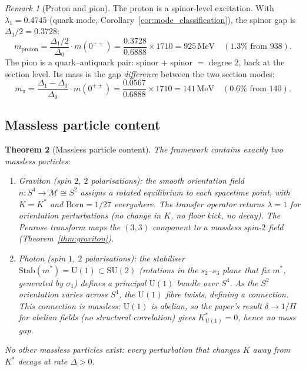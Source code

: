 \documentclass[11pt,a4paper]{article}
\newtheorem{theorem}{Theorem}[section]
\theoremstyle{definition}
\theoremstyle{remark}
\newtheorem{remark}[theorem]{Remark}
\begin{document}
\begin{remark}[Proton and pion]\label{rem:proton_pion}
The proton is a spinor-level excitation. With $\lambda_1=0.4745$ (quark mode, Corollary~\ref{cor:mode_classification}), the spinor gap is $\Delta_1/2=0.3728$:
\[
m_\mathrm{proton} = \frac{\Delta_1/2}{\Delta_0}\cdot m(0^{++}) = \frac{0.3728}{0.6888}\times 1710 = 925\,\mathrm{MeV} \quad (1.3\%\text{ from }938).
\]
The pion is a quark--antiquark pair: spinor $+$ spinor $=$ degree $2$, back at the section level. Its mass is the gap \emph{difference} between the two section modes:
\[
m_\pi = \frac{\Delta_1-\Delta_0}{\Delta_0}\cdot m(0^{++}) = \frac{0.0567}{0.6888}\times 1710 = 141\,\mathrm{MeV} \quad (0.6\%\text{ from }140).
\]
\end{remark}

\subsection{Massless particle content}

\begin{theorem}[Massless particle content]\label{thm:massless_content}
The framework contains exactly two massless particles:
\begin{enumerate}[nosep]
\item \emph{Graviton} (spin $2$, $2$ polarisations): the smooth orientation field $n:S^4\to\mathcal{M}\cong S^2$ assigns a rotated equilibrium to each spacetime point, with $K=K^*$ and $\mathrm{Born}=1/27$ everywhere. The transfer operator returns $\lambda=1$ for orientation perturbations (no change in $K$, no floor kick, no decay). The Penrose transform maps the $(3,3)$ component to a massless spin-$2$ field (Theorem~\ref{thm:graviton}).

\item \emph{Photon} (spin $1$, $2$ polarisations): the stabiliser $\mathrm{Stab}(m^*)=\mathrm{U}(1)\subset\mathrm{SU}(2)$ (rotations in the $s_2$--$s_3$ plane that fix $m^*$, generated by $\sigma_1$) defines a principal $\mathrm{U}(1)$ bundle over $S^4$. As the $S^2$ orientation varies across $S^4$, the $\mathrm{U}(1)$ fibre twists, defining a connection. This connection is massless: $\mathrm{U}(1)$ is abelian, so the paper's result $\delta\to 1/H$ for abelian fields (no structural correlation) gives $K^*_{\mathrm{U}(1)}=0$, hence no mass gap.
\end{enumerate}
No other massless particles exist: every perturbation that changes $K$ away from $K^*$ decays at rate $\Delta>0$.
\end{theorem}
\end{document}
